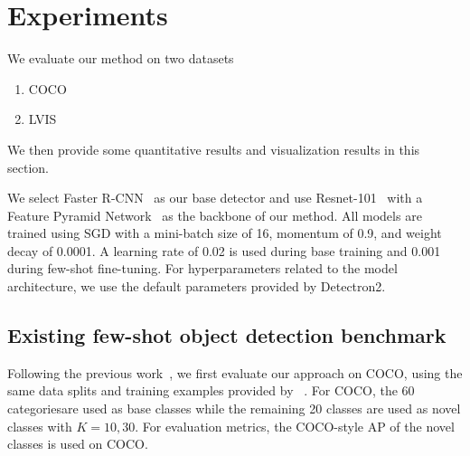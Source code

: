 \section{Experiments}

We evaluate our method on two datasets
\begin{enumerate}
	\item COCO
	\item LVIS
\end{enumerate}
We then provide some quantitative results and visualization results in this section.

We select Faster R-CNN~\cite{ren2015faster} as our base detector and use Resnet-101~\cite{he2016deep} with a Feature Pyramid Network~\cite{lin2016feature} as the backbone of our method.
All models are trained using SGD with a mini-batch size of 16, momentum of 0.9, and weight decay of 0.0001. A learning rate of 0.02 is used during base training and 0.001 during few-shot fine-tuning. 
For hyperparameters related to the model architecture, we use the default parameters provided by Detectron2.

\subsection{Existing few-shot object detection benchmark}
\label{sec:exist_benchmark}
Following the previous work~\cite{kang2019few,yan2019meta,wang2019meta}, we 
first evaluate our approach on COCO, using the same data splits and training examples provided by ~\citet{kang2019few}.
For COCO, the 60 categoriesare used as base classes while the remaining 20 classes are used as novel classes with $K=10, 30$.  For evaluation metrics, the COCO-style AP of the novel classes is used on COCO. 

